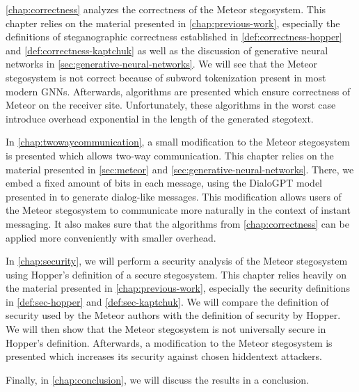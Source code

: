 \autoref{chap:correctness} analyzes the correctness of the Meteor stegosystem. 
This chapter relies on the material presented in \autoref{chap:previous-work}, especially the definitions of steganographic correctness established in \autoref{def:correctness-hopper} and \autoref{def:correctness-kaptchuk} as well as the discussion of generative neural networks in \autoref{sec:generative-neural-networks}.
We will see that the Meteor stegosystem is not correct because of subword tokenization present in most modern GNNs.
Afterwards, algorithms are presented which ensure correctness of Meteor on the receiver site.
Unfortunately, these algorithms in the worst case introduce overhead exponential in the length of the generated stegotext.

In \autoref{chap:twowaycommunication}, a small modification to the Meteor stegosystem is presented which allows two-way communication.
This chapter relies on the material presented in \autoref{sec:meteor} and \autoref{sec:generative-neural-networks}.
There, we embed a fixed amount of bits in each message, using the DialoGPT model presented in \cite{Zhang2020} to generate dialog-like messages.
This modification allows users of the Meteor stegosystem to communicate more naturally in the context of instant messaging.
It also makes sure that the algorithms from \autoref{chap:correctness} can be applied more conveniently with smaller overhead.

In \autoref{chap:security}, we will perform a security analysis of the Meteor stegosystem using Hopper's definition of a secure stegosystem.
This chapter relies heavily on the material presented in \autoref{chap:previous-work}, especially the security definitions in \autoref{def:sec-hopper} and \autoref{def:sec-kaptchuk}.
We will compare the definition of security used by the Meteor authors with the definition of security by Hopper.
We will then show that the Meteor stegosystem is not universally secure in Hopper's definition.
Afterwards, a modification to the Meteor stegosystem is presented which increases its security against chosen hiddentext attackers.

Finally, in \autoref{chap:conclusion}, we will discuss the results in a conclusion.